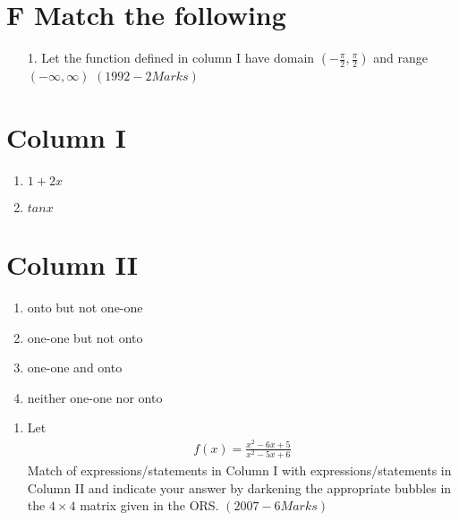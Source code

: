 \documentclass[journal,12pt,twocolumn,article]{IEEEtran}
\theoremstyle{remark}
\begin{document}
	\section*{F Match the following}
	\begin{enumerate}
		\item[1.] Let the function defined in column I have domain $(-\frac{\pi}{2},\frac{\pi}{2})$ and range $(-\infty,\infty)$ \hfill${(1992-2 Marks)}$
	\end{enumerate}
			\begin{multicols}{2} 
				\section*{Column I}
				\begin{enumerate}[label=(\Alph*)]
					\item $1+2x$
					\item $tanx$
				\end{enumerate}
				\columnbreak
				 \section*{Column II}
				\begin{enumerate}[label=(\alph*),start=16]
					\item onto but not one-one
					\item one-one but not onto
					\item one-one and onto
					\item neither one-one nor onto
				\end{enumerate}
			\end{multicols}
			\begin{enumerate}[start=2]
				\item Let 
					\begin{align*}
						f(x)=\frac{x^2-6x+5}{x^2-5x+6}
					\end{align*}
					 Match of expressions/statements in Column I with expressions/statements in Column II and indicate your answer by darkening the appropriate bubbles in the $4\times4$ matrix given in the ORS. \hfill{$(2007-6 Marks)$}
			\end{enumerate}
\end{document}
